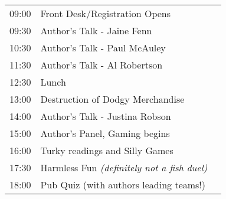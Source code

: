 \vspace{2mm} {\Large} \nopagebreak
\raggedright
\begin{center}
\begin{tabularx}{13cm}{c X l}

09:00 & Front Desk/Registration Opens\footnotemark[1] & \\
09:30 & Author's Talk - Jaine Fenn\footnotemark[2] & \\
10:30 & Author's Talk - Paul McAuley\footnotemark[2]\\
11:30 & Author's Talk - Al Robertson\footnotemark[2]\\
12:30 & Lunch\footnotemark[3] &\\
13:00 & Destruction of Dodgy Merchandise\footnotemark[4] & \\
14:00 & Author's Talk - Justina Robson\footnotemark[2]  & \\
15:00 & Author's Panel\footnotemark[2], Gaming begins\footnotemark[5] & \\
16:00 & Turky readings and Silly Games\footnotemark[2]\\
17:30 & Harmless Fun \it(definitely not a fish duel)\footnotemark[4]  &\\
18:00 & Pub Quiz (with authors leading teams!)\footnotemark[3] & \\
\end{tabularx}
\end{center}

